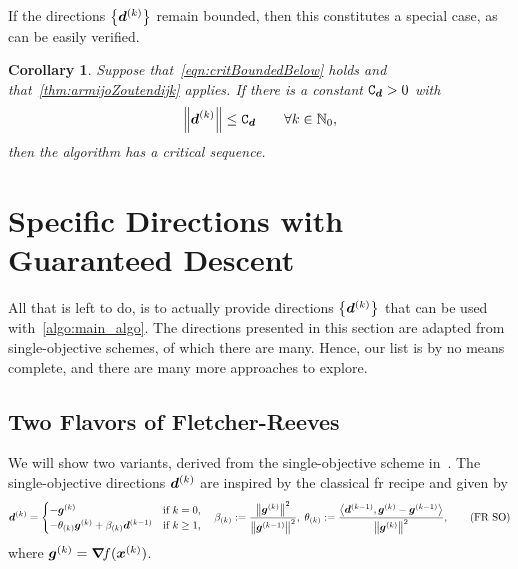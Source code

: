 \documentclass{article}
\theoremstyle{plain}
\newtheorem{corollary}[theorem]{Corollary}
\theoremstyle{definition}
\begin{document}
If the directions $\left\{\bm{d}^{(k)}\right\}$ remain bounded, then
this constitutes a special case, as can be easily verified.
\begin{corollary}%
	\label{thm:dirsBoundedConvergence}
	Suppose that~\eqref{eqn:critBoundedBelow} holds and 
	that~\cref{thm:armijoZoutendijk} applies.
	If there is a constant $\mathtt C_{\bm{d}} > 0$ with 
	$$
	\left\|\bm{d}^{(k)}\right\| \leq \mathtt C_{\bm{d}}
	\qquad \forall k \in \mathbb N_0,
	$$
	then the algorithm has a critical sequence.
\end{corollary}

\section{Specific Directions with Guaranteed Descent}

All that is left to do, is to actually provide directions $\left\{\bm{d}^{(k)}\right\}$ that
can be used with~\cref{algo:main_algo}.
The directions presented in this section are adapted from single-objective schemes,
of which there are many.
Hence, our list is by no means complete, and there are many more approaches to explore.

\subsection{Two Flavors of Fletcher-Reeves}
We will show two variants, derived from 
the single-objective scheme in~\cite{zhangGlobalConvergenceModified2006}.
The single-objective directions $\bm{d}^{(k)}$ are inspired by the
classical \ac{fr} recipe and given by
\begin{equation}
	\bm{d}^{(k)} = 
	\begin{cases}
		-\bm{g}^{(k)}
		&\text{if $k=0$},
		\\
		-\theta_{(k)}\bm{g}^{(k)}
		+ 
		\beta_{(k)}
		\bm{d}^{(k-1)}
		&\text{if $k\geq 1$,}
	\end{cases}
	\quad
	\beta_{(k)}
	:= 
	\frac{\left\|\bm{g}^{(k)}\right\|^2}{\left\|\bm{g}^{(k-1)}\right\|^2},
	\;
	\theta_{(k)}
	:=
	\frac{
		\left\langle \bm{d}^{(k-1)}, \bm{g}^{(k)} - \bm{g}^{(k-1)} \right\rangle
		}{
			\left\|\bm{g}^{(k)}\right\|^2
		},
		\tag{FR~SO}
		\label{eqn:frSO}
\end{equation}
where $\bm{g}^{(k)} = \bm{\nabla}\!f(\bm{x}^{(k)})$.
\end{document}
